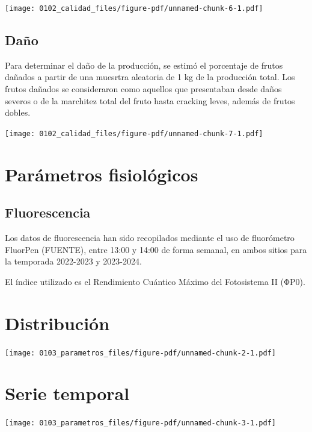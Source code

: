 \documentclass[
  letterpaper,
  DIV=11,
  numbers=noendperiod]{scrreprt}
\begin{document}
\begin{center}
\texttt{[image: 0102\_calidad\_files/figure-pdf/unnamed-chunk-6-1.pdf]}
\end{center}

\section{Daño}\label{dauxf1o}

Para determinar el daño de la producción, se estimó el porcentaje de
frutos dañados a partir de una muesrtra aleatoria de 1 kg de la
producción total. Los frutos dañados se consideraron como aquellos que
presentaban desde daños severos o de la marchitez total del fruto hasta
cracking leves, además de frutos dobles.

\begin{center}
\texttt{[image: 0102\_calidad\_files/figure-pdf/unnamed-chunk-7-1.pdf]}
\end{center}

\chapter{Parámetros fisiológicos}\label{paruxe1metros-fisioluxf3gicos}

\section{Fluorescencia}\label{fluorescencia}

Los datos de fluorescencia han sido recopilados mediante el uso de
fluorómetro FluorPen (FUENTE), entre 13:00 y 14:00 de forma semanal, en
ambos sitios para la temporada 2022-2023 y 2023-2024.

El índice utilizado es el Rendimiento Cuántico Máximo del Fotosistema II
(ΦP0).

\chapter{Distribución}

\begin{center}
\texttt{[image: 0103\_parametros\_files/figure-pdf/unnamed-chunk-2-1.pdf]}
\end{center}

\chapter{Serie temporal}

\begin{center}
\texttt{[image: 0103\_parametros\_files/figure-pdf/unnamed-chunk-3-1.pdf]}
\end{center}
\end{document}

